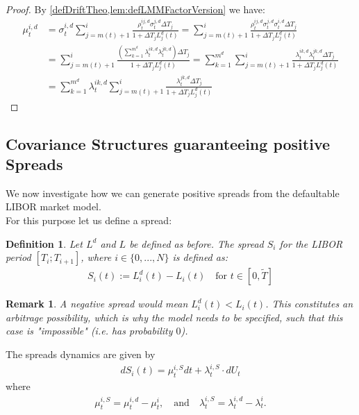 \documentclass[12pt]{article}
\newtheorem{remark}[theorem]{Remark}
\newtheorem{definition}[theorem]{Definition}
\begin{document}
	\begin{proof}
		By \cref{defDriftTheo,lem:defLMMFactorVersion} we have:
		\begin{align*}
			\mu^{i, d}_t &= \sigma^{i, d}_t\sum_{j=m(t)+1}^{i}\frac{\rho^{i j, d}_t \sigma^{j, d}_t\Delta T_j}{1 + \Delta T_j L^d_j(t)} = \sum_{j=m(t)+1}^{i}\frac{\rho^{i j, d}_t \sigma^{j, d}_t \sigma^{i, d}_t\Delta T_j}{1 + \Delta T_j L^d_j(t)}\\
			&= \sum_{j=m(t)+1}^{i}\frac{\left(\sum_{k=1}^{m^d}\lambda^{i k,d}_t\lambda^{j k,d}_t\right)\Delta T_j}{1 + \Delta T_j L^d_j(t)}
			=\sum_{k=1}^{m^d}\sum_{j=m(t)+1}^{i}\frac{\lambda^{i k,d}_t\lambda^{j k,d}_t\Delta T_j}{1 + \Delta T_j L^d_j(t)}\\
			&= \sum_{k=1}^{m^d}\lambda^{i k,d}_t\sum_{j=m(t)+1}^{i}\frac{\lambda^{j k,d}_t\Delta T_j}{1 + \Delta T_j L^d_j(t)}
		\end{align*}
	\end{proof}
	
	
	\subsection{Covariance Structures guaranteeing positive Spreads}
	We now investigate how we can generate positive spreads from the defaultable LIBOR market model.\\
	For this purpose let us define a spread:
	\begin{definition}
		Let $L^d$ and $L$ be defined as before.
		The \emph{spread} $S_i$ for the LIBOR period $[T_i; T_{i+1}]$, where $i \in \{0, ..., N\}$ is defined as:
		\begin{align*}
			S_i(t) := L^d_i(t) - L_i(t) \quad \text{for } t \in \left[0,\tilde{T}\right]
		\end{align*}
	\end{definition}
	\begin{remark}
		A negative spread would mean $L^d_i(t) < L_i(t)$. This constitutes an arbitrage possibility, 
		which is why the model needs to be specified, such that this case is "impossible" (i.e. has probability $0$).
	\end{remark}
	The spreads dynamics are given by
	\begin{align*}
		dS_i(t) = \mu^{i,S}_t dt + \lambda^{i,S}_t \cdot dU_t
	\end{align*}
	where 
	\begin{align*}
		\mu^{i,S}_t = \mu^{i,d}_t - \mu^{i}_t, \quad \text{and} 
		\quad \lambda^{i,S}_t = \lambda^{i,d}_t - \lambda^{i}_t.
	\end{align*}
	
\end{document}
